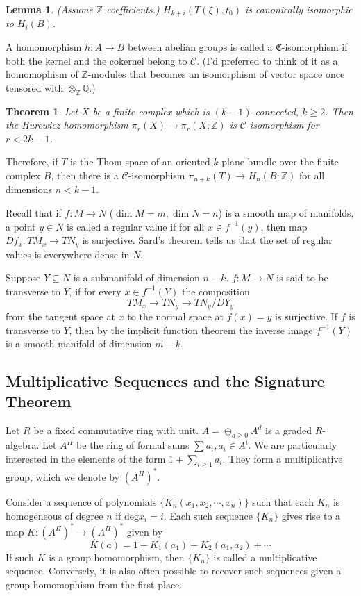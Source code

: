 \documentclass[12pt]{article}
\theoremstyle{plain}
\newtheorem{theorem}[equation]{Theorem}
\newtheorem{lemma}[equation]{Lemma}
\theoremstyle{definition}
\newcommand{\IQ}{\mathbb{Q}}
\newcommand{\IZ}{\mathbb{Z}}
\newcommand{\sC}{\mathfrak{C}}
\newcommand{\cC}{\mathcal{C}}
\renewcommand{\deg}{\mathrm{deg}}
\newcommand\tensor{{\otimes}}
\newcommand{\<}{\langle}
\renewcommand{\>}{\rangle}
\begin{document}
\begin{lemma}
(Assume $\IZ$ coefficients.) $H_{k + i}(T(\xi), t_0)$ is canonically isomorphic to $H_i(B)$. 
\end{lemma}

A homomorphism $h : A \to B$ between abelian groups is called a $\sC$-isomorphism if both the kernel and the cokernel belong to $\cC$. (I'd preferred to think of it as a homomophism of $\IZ$-modules that becomes an isomorphism of vector space once tensored with $\tensor_\IZ \IQ$.)

\begin{theorem}
Let $X$ be a finite complex which is $(k - 1)$-connected, $k \ge 2$. Then the Hurewicz homomorphism $\pi_r(X) \to \pi_r(X; \IZ)$ is $\cC$-isomorphism for $r < 2k - 1$. 
\end{theorem}

Therefore, if $T$ is the Thom space of an oriented $k$-plane bundle over the finite complex $B$, then there is a $\cC$-isomorphism $\pi_{n + k}(T) \to H_n(B; \IZ)$ for all dimensions $n < k - 1$. 

Recall that if $f : M \to N$ ($\dim M = m, \dim N = n$) is a smooth map of manifolds, a point $y \in N$ is called a regular value if for all $x \in f^{-1}(y)$, then map $Df_x : TM_x \to TN_y$ is surjective. Sard's theorem tells us that the set of regular values is everywhere dense in $N$. 

Suppose $Y \subseteq N$ is a submanifold of dimension $n - k$. $f : M \to N$ is said to be transverse to $Y$, if for every $x \in f^{-1}(Y)$ the composition 
$$ TM_x \to TN_y \to TN_y/DY_y $$
from the tangent space at $x$ to the normal space at $f(x) = y$ is surjective. If $f$ is transverse to $Y$, then by the implicit function theorem the inverse image $f^{-1}(Y)$ is a smooth manifold of dimension $m - k$. 


\subsection{Multiplicative Sequences and the Signature Theorem}
Let $R$ be a fixed commutative ring with unit. $A = \oplus_{d \ge 0} A^d$ is a graded $R$-algebra. Let $A^\Pi$ be the ring of formal sums $\sum a_i, a_i \in A^i$. We are particularly interested in the elements of the form $1 + \sum_{i \ge 1} a_i$. They form a multiplicative group, which we denote by $(A^\Pi)^*$. 

Consider a sequence of polynomials $\{ K_n(x_1, x_2, \cdots, x_n) \}$ such that each $K_n$ is homogeneous of degree $n$ if $\deg x_i = i$. Each such sequence $\{ K_n \}$ gives rise to a map $K : (A^\Pi)^* \to (A^\Pi)^*$ given by 
$$ K(a) = 1 + K_1(a_1) + K_2(a_1, a_2) + \cdots $$
If such $K$ is a group homomorphism, then $\{ K_n \}$ is called a multiplicative sequence. Conversely, it is also often possible to recover such sequences given a group homomophism from the first place. 
\end{document}
